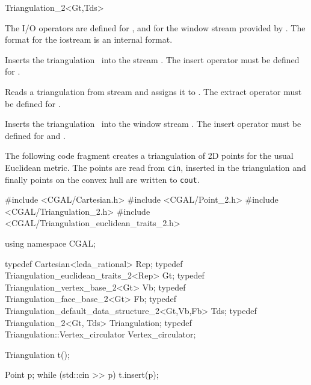 \begin{ccClassTemplate}{Triangulation_2<Gt,Tds>}


The I/O operators are defined for , and for
the window stream provided by \cgal. The format for the iostream
is an internal format. 


{Inserts the triangulation \ccVar\ into the stream .
\ccPrecond The insert operator must be defined for .}

{Reads a triangulation from stream  and assigns it
to \ccVar. \ccPrecond The extract operator must be defined for .}


{Inserts the triangulation \ccVar\ into the window stream .
The insert operator must be defined for 
and .}

\ccExample

The following code fragment creates a  triangulation of 2D points
for the  usual Euclidean metric. The points are read from {\tt cin},
inserted in the triangulation 
and finally points on the convex hull are written to {\tt cout}. 


\begin{cprog}
#include <CGAL/Cartesian.h>
#include <CGAL/Point_2.h>
#include <CGAL/Triangulation_2.h>
#include <CGAL/Triangulation_euclidean_traits_2.h>

using namespace CGAL;

typedef Cartesian<leda_rational> Rep;
typedef Triangulation_euclidean_traits_2<Rep> Gt;
typedef Triangulation_vertex_base_2<Gt> Vb;
typedef Triangulation_face_base_2<Gt>  Fb;
typedef Triangulation_default_data_structure_2<Gt,Vb,Fb> Tds;
typedef Triangulation_2<Gt, Tds> Triangulation;
typedef Triangulation::Vertex_circulator Vertex_circulator;

{
    Triangulation t();

    Point p;
    while (std::cin >> p){
        t.insert(p);
    }

}
\end{cprog}
\end{ccClassTemplate}
